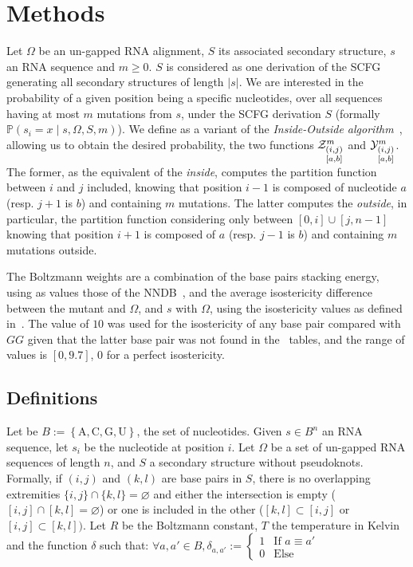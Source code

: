 \section{Methods}
\label{sec:methods}
Let $\Omega$ be an un-gapped RNA alignment, $S$ its associated secondary structure, $s$ an RNA 
sequence and $m\geq 0$. $S$ is considered as  one derivation of the SCFG generating  
all  secondary structures of length  $|s|$. We are interested in  
the probability of a given position being a specific nucleotides,
over all sequences having at most $m$ mutations from $s$, under the SCFG derivation $S$ 
(formally 
$\mathbb{P}(s_i = x\mid s,\Omega, S,m)$). 
We define as a variant of the
 \emph{Inside-Outside algorithm}~\cite{Lari1990}, allowing us to obtain the
 desired probability,  the two  functions
$\Z{i,j}{m}{a,b}$ and $\Y{i,j}{m}{a,b}$. The former, as the 
equivalent of the \emph{inside}, computes the partition function between $i$ and $j$ included, 
knowing that position $i-1$ is composed of nucleotide $a$ (resp. $j+1$ is $b$) and containing $m$ mutations. The latter computes the \emph{outside}, in particular,  
the partition function considering only between $[0,i]\cup[j,n-1]$
knowing  that position $i+1$ is composed of $a$ (resp. $j-1$ is $b$) and containing 
 $m$ mutations outside.

The Boltzmann weights are a combination of the base pairs stacking energy, 
using as values those of the NNDB~\cite{Turner2010}, and
the average isostericity difference
between the mutant and $\Omega$, and $s$ with $\Omega$, using the isostericity values
 as defined in~\cite{Stombaugh2009}. The value of $10$ was used for the isostericity
 of any base pair 
 compared with $GG$ given that the latter base pair was not
  found in the~\cite{Stombaugh2009} tables,
 and the range of values is $[0,9.7]$, $0$ for a perfect isostericity.


\subsection{Definitions}
Let be $B:=\left\{\text{A},\text{C},\text{G},\text{U}\right\}$, the set of nucleotides.
Given $s\in B^n$ an RNA sequence, let $s_i$ be the nucleotide at position $i$. Let $\Omega$ be a set of un-gapped RNA sequences of
length $n$, and $S$ a secondary structure without pseudoknots. 
Formally, if $(i,j)$ and $(k,l)$ are base pairs in $S$, there is no overlapping extremities
 $\{i,j\}\cap \{k,l\}=\varnothing$ and either the intersection is empty 
 ($[i,j]\cap[k,l]=\varnothing$) or one is included in the other ($[k,l]\subset[i,j]$ or 
 $[i,j]\subset[k,l])$. Let $R$ be the Boltzmann constant, $T$ the temperature in Kelvin and
  the function $\delta$ such that: 
 $\forall a,a' \in B, \delta_{a,a'}:=\left\{\begin{array}{ll}
															1 & \text{If } a\equiv a'\\
															0 & \text{Else}
														\end{array}\right.$

